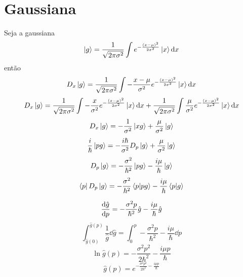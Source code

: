 \documentclass[report,14pt,openright,oneside,a4paper,brazil]{abntex2}
\newcommand{\abrir}[2]{\int{#1}\ket{#2}\dd{#2}}
\begin{document}
\section{Gaussiana}
Seja a gaussiana
\begin{equation}
    \ket{g}=\frac{1}{\sqrt{2\pi\sigma^2}} \abrir{e^{-\frac{(x-\mu)^2}{2\sigma^2}}}{x}
\end{equation}
então
\begin{equation}
    D_x\ket{g}=\frac{1}{\sqrt{2\pi\sigma^2}} \abrir{-\frac{x-\mu}{\sigma^2} e^{-\frac{(x-\mu)^2}{2\sigma^2}}}{x}
\end{equation}
\begin{equation}
    D_x\ket{g}=\frac{1}{\sqrt{2\pi\sigma^2}} \abrir{-\frac{x}{\sigma^2} e^{-\frac{(x-\mu)^2}{2\sigma^2}}}{x}+\frac{1}{\sqrt{2\pi\sigma^2}} \abrir{\frac{\mu}{\sigma^2} e^{-\frac{(x-\mu)^2}{2\sigma^2}}}{x}
\end{equation}
\begin{equation}
    D_x\ket{g}=-\frac{1}{\sigma^2}\ket{xg}+\frac{\mu}{\sigma^2}\ket{g}
\end{equation}
\begin{equation}
    \frac{i}{\hbar}\ket{pg}=-\frac{i\hbar}{\sigma^2}D_p\ket{g}+\frac{\mu}{\sigma^2}\ket{g}
\end{equation}
\begin{equation}
    D_p\ket{g}=-\frac{\sigma^2}{\hbar^2} \ket{pg}-\frac{i\mu}{\hbar} \ket{g}
\end{equation}
\begin{equation}
    \bra{p}D_p\ket{g}=-\frac{\sigma^2}{\hbar^2} \bra{p}\ket{pg}-\frac{i\mu}{\hbar} \bra{p}\ket{g}
\end{equation}

\begin{equation}
    \dv{\hat g}{p} = -\frac{\sigma^2p}{\hbar^2} \hat{g}-\frac{i\mu}{\hbar} \hat g
\end{equation}
\begin{equation}
    \int_{\hat{g}(0)}^{\hat{g}(p)} \frac{1}{\hat g} \dd{\hat g} = \int_0^p -\frac{\sigma^2p}{\hbar^2} -\frac{i\mu}{\hbar} \dd{p} 
\end{equation}
\begin{equation}
    \ln {\hat g(p)} = -\frac{\sigma^2p^2}{2\hbar^2} -\frac{i\mu p}{\hbar} 
\end{equation}
\begin{equation}
    \hat g(p) = e^{-\frac{\sigma^2p^2}{2\hbar^2} -\frac{i\mu p}{\hbar}} 
\end{equation}
\end{document}
